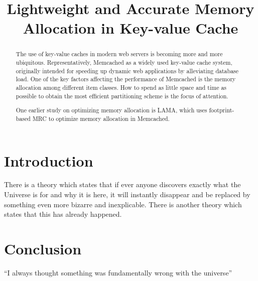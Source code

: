 \documentclass[oribibl]{llncs}
\title{Lightweight and Accurate Memory Allocation in Key-value Cache}
\begin{document}
\maketitle

\begin{abstract}
The use of key-value caches in modern web servers is becoming more and more ubiquitous. Representatively, Memcached as a widely used key-value cache system, originally intended for speeding up dynamic web applications by alleviating database load. One of the key factors affecting the performance of Memcached is the memory allocation among different item classes. How to spend as little space and time as possible to obtain the most efficient partitioning scheme is the focus of attention.

One earlier study on optimizing memory allocation is LAMA, which uses footprint-based MRC to optimize memory allocation in Memcached.
\end{abstract}

\section{Introduction}
There is a theory which states that if ever anyone discovers exactly what the Universe is for and why it is here, it will instantly disappear and be replaced by something even more bizarre and inexplicable.
There is another theory which states that this has already happened.


\section{Conclusion}
``I always thought something was fundamentally wrong with the universe'' \cite{adams1995hitchhiker}



\end{document}
